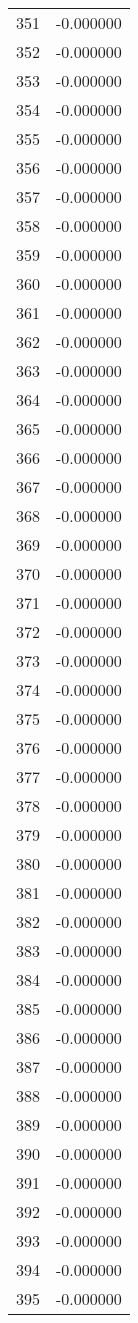 \documentclass[12pt]{article}
\begin{document}
\begin{longtable}{@{}cc@{}}
351 & -0.000000 \\
352 & -0.000000 \\
353 & -0.000000 \\
354 & -0.000000 \\
355 & -0.000000 \\
356 & -0.000000 \\
357 & -0.000000 \\
358 & -0.000000 \\
359 & -0.000000 \\
360 & -0.000000 \\
361 & -0.000000 \\
362 & -0.000000 \\
363 & -0.000000 \\
364 & -0.000000 \\
365 & -0.000000 \\
366 & -0.000000 \\
367 & -0.000000 \\
368 & -0.000000 \\
369 & -0.000000 \\
370 & -0.000000 \\
371 & -0.000000 \\
372 & -0.000000 \\
373 & -0.000000 \\
374 & -0.000000 \\
375 & -0.000000 \\
376 & -0.000000 \\
377 & -0.000000 \\
378 & -0.000000 \\
379 & -0.000000 \\
380 & -0.000000 \\
381 & -0.000000 \\
382 & -0.000000 \\
383 & -0.000000 \\
384 & -0.000000 \\
385 & -0.000000 \\
386 & -0.000000 \\
387 & -0.000000 \\
388 & -0.000000 \\
389 & -0.000000 \\
390 & -0.000000 \\
391 & -0.000000 \\
392 & -0.000000 \\
393 & -0.000000 \\
394 & -0.000000 \\
395 & -0.000000 \\

\end{longtable}
\end{document}
